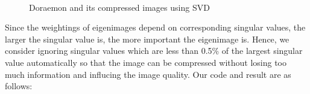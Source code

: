 \documentclass[12pt]{article}
\begin{document}
\begin{figure}[H]
    \centering
    \\
    \caption{Doraemon and its compressed images using SVD}
    \label{ref_label_overall}
\end{figure}
\begin{flushleft}
Since the weightings of eigenimages depend on corresponding singular values, the larger the singular value is,
the more important the eigenimage is. Hence, we consider ignoring singular values which are less than 0.5\% of the 
largest singular value automatically so that the image can be compressed without losing too much information and influcing
the image quality. Our code and result are as follows:\\
\end{flushleft}
\end{document}
